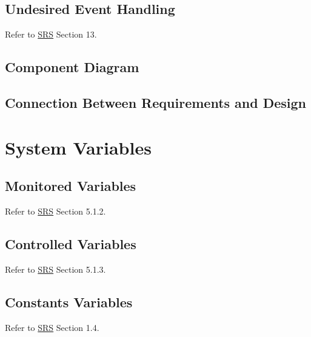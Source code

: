 \documentclass[12pt, titlepage]{article}
\begin{document}
\subsection{Undesired Event Handling}

Refer to \href{https://github.com/zakerl/Capstone_Project/blob/main/docs/SRS/SRS.pdf}{SRS} Section 13.

\subsection{Component Diagram}

\subsection{Connection Between Requirements and Design} \label{SecConnection}


\section{System Variables}

\subsection{Monitored Variables}

Refer to \href{https://github.com/zakerl/Capstone_Project/blob/main/docs/SRS/SRS.pdf}{SRS} Section 5.1.2.
\subsection{Controlled Variables}

Refer to \href{https://github.com/zakerl/Capstone_Project/blob/main/docs/SRS/SRS.pdf}{SRS} Section 5.1.3.

\subsection{Constants Variables}

Refer to \href{https://github.com/zakerl/Capstone_Project/blob/main/docs/SRS/SRS.pdf}{SRS} Section 1.4.
\end{document}
